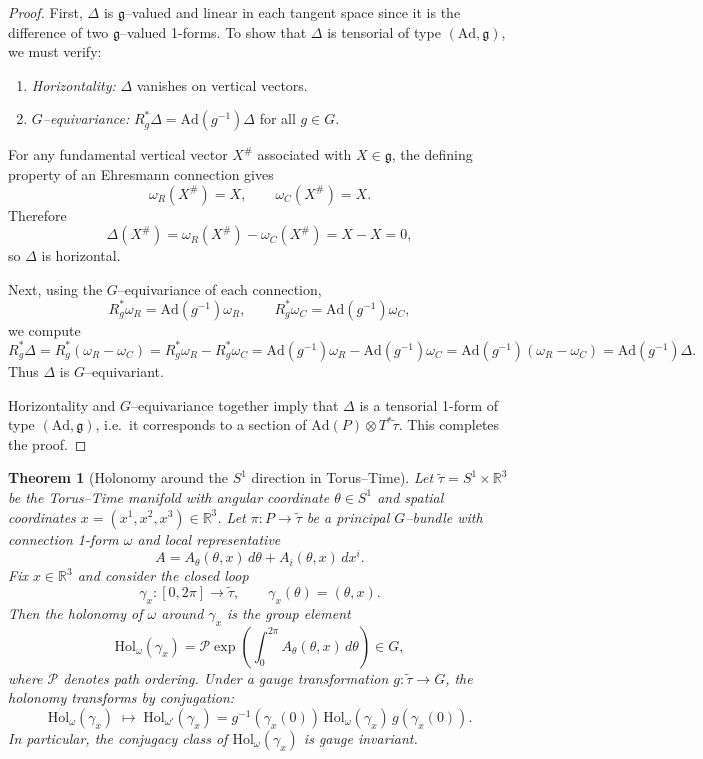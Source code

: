 \documentclass[12pt,openany]{book}
\theoremstyle{plain}
\newtheorem{theorem}{Theorem}[chapter]
\theoremstyle{definition}
\theoremstyle{remark}
\begin{document}
\begin{proof}
First, $\Delta$ is $\mathfrak{g}$--valued and linear in each tangent space
since it is the difference of two $\mathfrak{g}$--valued 1-forms. To show
that $\Delta$ is tensorial of type $(\mathrm{Ad},\mathfrak{g})$, we must
verify:

\begin{enumerate}
    \item \emph{Horizontality:} $\Delta$ vanishes on vertical vectors.
    \item \emph{$G$--equivariance:} $R_g^* \Delta = \mathrm{Ad}(g^{-1})\Delta$
    for all $g \in G$.
\end{enumerate}

For any fundamental vertical vector $X^\#$ associated with $X \in \mathfrak{g}$,
the defining property of an Ehresmann connection gives
\[
\omega_R(X^\#) = X,
\qquad
\omega_C(X^\#) = X.
\]
Therefore
\[
\Delta(X^\#)
= \omega_R(X^\#) - \omega_C(X^\#)
= X - X
= 0,
\]
so $\Delta$ is horizontal.

Next, using the $G$--equivariance of each connection,
\[
R_g^* \omega_R = \mathrm{Ad}(g^{-1})\omega_R,
\qquad
R_g^* \omega_C = \mathrm{Ad}(g^{-1})\omega_C,
\]
we compute
\[
R_g^* \Delta
= R_g^*(\omega_R - \omega_C)
= R_g^* \omega_R - R_g^* \omega_C
= \mathrm{Ad}(g^{-1})\omega_R - \mathrm{Ad}(g^{-1})\omega_C
= \mathrm{Ad}(g^{-1})(\omega_R - \omega_C)
= \mathrm{Ad}(g^{-1})\Delta.
\]
Thus $\Delta$ is $G$--equivariant.

Horizontality and $G$--equivariance together imply that $\Delta$ is a
tensorial 1-form of type $(\mathrm{Ad},\mathfrak{g})$, i.e.\ it corresponds
to a section of $\mathrm{Ad}(P) \otimes T^*\tilde{\tau}$. This completes
the proof.
\end{proof}

\begin{theorem}[Holonomy around the $S^1$ direction in Torus--Time]
Let $\tilde{\tau} = S^1 \times \mathbb{R}^3$ be the Torus--Time manifold
with angular coordinate $\theta \in S^1$ and spatial coordinates
$x = (x^1,x^2,x^3) \in \mathbb{R}^3$. Let $\pi : P \to \tilde{\tau}$ be a
principal $G$--bundle with connection 1-form $\omega$ and local
representative
\[
A = A_\theta(\theta,x)\, d\theta + A_i(\theta,x)\, dx^i.
\]
Fix $x \in \mathbb{R}^3$ and consider the closed loop
\[
\gamma_x : [0,2\pi] \to \tilde{\tau},
\qquad
\gamma_x(\theta) = (\theta, x).
\]
Then the holonomy of $\omega$ around $\gamma_x$ is the group element
\[
\mathrm{Hol}_\omega(\gamma_x)
= \mathcal{P} \exp\!\left(
    \int_0^{2\pi} A_\theta(\theta,x)\, d\theta
  \right) \in G,
\]
where $\mathcal{P}$ denotes path ordering. Under a gauge transformation
$g : \tilde{\tau} \to G$, the holonomy transforms by conjugation:
\[
\mathrm{Hol}_\omega(\gamma_x)
\;\mapsto\;
\mathrm{Hol}_{\omega'}(\gamma_x)
= g^{-1}(\gamma_x(0))\,
  \mathrm{Hol}_\omega(\gamma_x)\,
  g(\gamma_x(0)).
\]
In particular, the conjugacy class of $\mathrm{Hol}_\omega(\gamma_x)$ is
gauge invariant.
\end{theorem}
\end{document}
